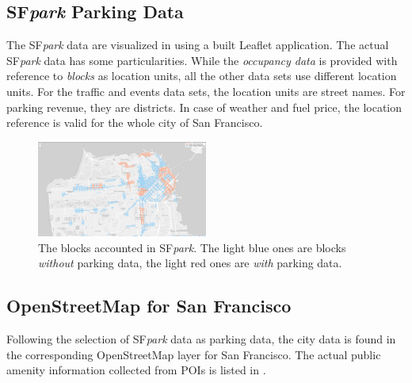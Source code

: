 \subsection{SF\textit{park} Parking Data}
\label{evaluation:sfpark}
The SF\textit{park} data are visualized in  using a built Leaflet application.
The actual SF\textit{park} data has some particularities.
While the \textit{occupancy data} is provided with reference to \textit{blocks} as location units, all the other data sets use different location units.
For the traffic and events data sets, the location units are street names.
For parking revenue, they are districts.
In case of weather and fuel price, the location reference is valid for the whole city of San Francisco. 

\begin{figure}[!ht]
	\centering
	\includegraphics[width=0.5\textwidth]{graphics/initial_view_before_clusteringV7.png}
	\caption{The blocks accounted in SF\textit{park}. The light blue ones are blocks \textit{without} parking data, the light red ones are \textit{with} parking data.}
	\label{fig:before_clustering}
\end{figure}

\subsection{OpenStreetMap for San Francisco}
\label{evaluation:osm_for_sf}
Following the selection of SF\textit{park} data as parking data, the city data is found in the corresponding OpenStreetMap layer for San Francisco.
The actual public amenity information collected from POIs is listed in .

